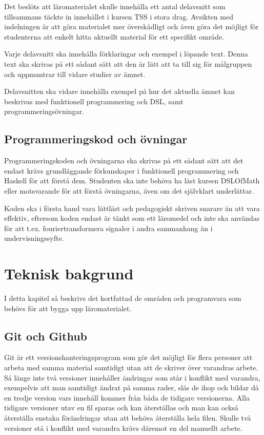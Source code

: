 \documentclass[]{article}
\begin{document}
Det beslöts att läromaterialet skulle innehålla ett antal delavsnitt som
tillsammans täckte in innehållet i kursen TSS i stora drag.
Avsikten med indelningen är att göra materialet mer överskådligt och
även göra det möjligt för studenterna att enkelt hitta aktuellt material
för ett specifikt område.

Varje delavsnitt ska innehålla förklaringar och exempel i löpande text.
Denna text ska skrivas på ett sådant sätt att den är lätt att ta till
sig för målgruppen och uppmuntrar till vidare studier av ämnet.

Delavsnitten ska vidare innehålla exempel på hur det aktuella ämnet kan
beskrivas med funktionell programmering och DSL, samt programmeringsövningar.

\subsection{Programmeringskod och övningar}

Programmeringskoden och övningarna ska skrivas på ett sådant sätt att det endast krävs grundläggande förkunskaper i
funktionell programmering och Haskell för att förstå dem. Studenten ska inte behöva ha läst kursen DSLOfMath eller
motsvarande för att förstå övningarna, även om det självklart underlättar.

Koden ska i första hand vara lättläst och pedagogiskt skriven snarare än att vara effektiv, eftersom koden endast är
tänkt som ett läromedel och inte ska användas för att t.ex. fouriertransformera signaler i andra sammanhang än i
undervisningssyfte.


\section{Teknisk bakgrund}
I detta kapitel så beskrivs det kortfattad de områden och programvara som
behövs för att bygga upp läromaterialet.

\subsection{Git och Github}
Git är ett versionshanteringsprogram som gör det möjligt för flera personer att
arbeta med samma material samtidigt utan att de skriver över varandras arbete.
Så länge inte två versioner innehåller ändringar som står i konflikt med
varandra, exempelvis att man samtidigt ändrat på samma rader, slås de ihop och
bildar då en tredje version vars innehåll kommer från båda de tidigare
versionerna. Alla tidigare versioner utav en fil sparas och kan återställas och
man kan också återställa enstaka förändringar utan att behöva återställa hela
filen. Skulle två versioner stå i konflikt med varandra krävs däremot en del
manuellt arbete.
\end{document}
